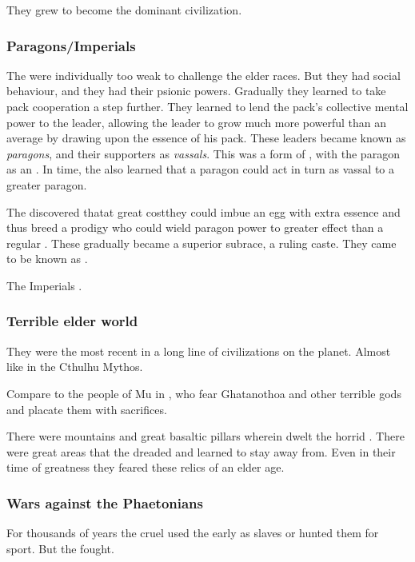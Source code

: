 They grew to become the dominant civilization. 





\subsubsection{Paragons/Imperials}
The \ophidians were individually too weak to challenge the elder races. 
But they had social behaviour, and they had their psionic powers. 
Gradually they learned to take pack cooperation a step further. 
They learned to lend the pack's collective mental power to the leader, allowing the leader to grow much more powerful than an average \ophidian by drawing upon the essence of his pack.
These leaders became known as \emph{paragons}, and their supporters as \emph{vassals}.
This was a form of \emph{\nexus}, with the paragon as an \emph{\apex}. 
In time, the \ophidians also learned that a paragon could act in turn as vassal to a greater paragon. 

The \ophidians discovered that\dash at great cost\dash they could imbue an egg with extra essence and thus breed a prodigy who could wield paragon power to greater effect than a regular \ophidian. 
These  gradually became a superior subrace, a ruling caste. 
They came to be known as .

The \ophidian Imperials . 





\subsubsection{Terrible elder world}
They were the most recent in a long line of civilizations on the planet. 
Almost like \humans in the Cthulhu Mythos. 

Compare to the people of Mu in \cite{HPLovecraft:OutoftheAeons}, who fear Ghatanothoa and other terrible gods and placate them with sacrifices. 

There were mountains and great basaltic pillars wherein dwelt the horrid . 
There were great areas that the \ophidians dreaded and learned to stay away from.
Even in their time of greatness they feared these relics of an elder age. 





\subsubsection{Wars against the Phaetonians}
For thousands of years the cruel  used the early \ophidians as slaves or hunted them for sport. 
But the \ophidians fought. 

